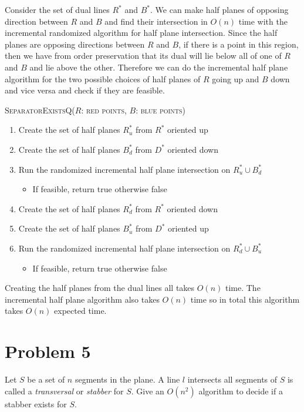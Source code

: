 \documentclass[12pt]{extarticle}
\begin{document}
\begin{solution}
    Consider the set of dual lines $R^*$ and $B^*$. We can make half planes of opposing direction between $R$ and $B$ and find their intersection in $O(n)$ time with the incremental randomized algorithm for half plane intersection. Since the half planes are opposing directions between $R$ and $B$, if there is a point in this region, then we have from order preservation that its dual will lie below all of one of $R$ and $B$ and lie above the other. Therefore we can do the incremental half plane algorithm for the two possible choices of half planes of $R$ going up and $B$ down and vice versa and check if they are feasible.
    \begin{algorithm}[H]
        \caption{\textsc{SeparatorExistsQ($R$: red points, $B$: blue points)}}
        \begin{enumerate}
            \item Create the set of half planes $R_u^*$ from $R^*$ oriented up
            \item Create the set of half planes $B_d^*$ from $D^*$ oriented down
            \item Run the randomized incremental half plane intersection on $R_u^* \cup B_d^*$
                \begin{itemize}
                    \item If feasible, return true otherwise false
                \end{itemize}
            \item Create the set of half planes $R_d^*$ from $R^*$ oriented down
            \item Create the set of half planes $B_u^*$ from $D^*$ oriented up
            \item Run the randomized incremental half plane intersection on $R_d^* \cup B_u^*$
                \begin{itemize}
                    \item If feasible, return true otherwise false
                \end{itemize}
        \end{enumerate}
    \end{algorithm}

    Creating the half planes from the dual lines all takes $O(n)$ time. The incremental half plane algorithm also takes $O(n)$ time so in total this algorithm takes $O(n)$ expected time.
\end{solution}

\section*{Problem 5}
Let $S$ be a set of $n$ segments in the plane. A line $l$ intersects all segments of $S$ is called a \textit{transversal} or \textit{stabber} for $S$. Give an $O(n^2)$ algorithm to decide if a stabber exists for $S$.
\end{document}

